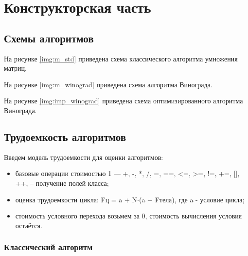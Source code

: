 \chapter{Конструкторская часть}

\section{Схемы алгоритмов}

На рисунке \ref{img:m_std} приведена схема классического алгоритма умножения матриц.


На рисунке \ref{img:m_winograd} приведена схема алгоритма Винограда.


На рисунке \ref{img:imp_winograd} приведена схема оптимизированного алгоритма Винограда.

\newpage
{}

\newpage
{}

\newpage
{}

\section{Трудоемкость алгоритмов}

Введем модель трудоемкости для оценки алгоритмов:
\begin{itemize}
	\item  базовые операции стоимостью 1 — +, -, *, /, =, ==, <=, >=, !=, +=, [], ++, -- получение полей класса;
	\item оценка трудоемкости цикла: Fц = a + N$\cdot$(a + Fтела), где a - условие цикла;
	\item стоимость условного перехода возьмем за 0, стоимость вычисления условия остаётся.
\end{itemize}

\subsection{Классический алгоритм}

